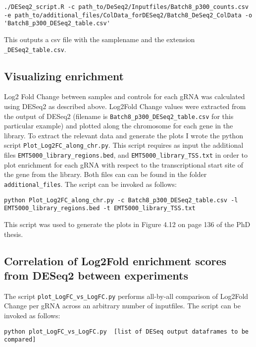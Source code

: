 \begin{small}\begin{lstlisting}
./DESeq2_script.R -c path_to/DeSeq2/Inputfiles/Batch8_p300_counts.csv -e path_to/additional_files/ColData_forDESeq2/Batch8_DeSeq2_ColData -o 'Batch8_p300_DESeq2_table.csv'
\end{lstlisting}\end{small}

This outputs a csv file with the samplename and the extension \verb|_DESeq2_table.csv|.

\subsection{Visualizing enrichment}
Log2 Fold Change between samples and controls for each gRNA was calculated using DESeq2 as described above. Log2Fold Change values were extracted from the output of DESeq2 (filename is \verb|Batch8_p300_DESeq2_table.csv| for this particular example) and plotted along the chromosome for each gene in the library. To extract the relevant data and generate the plots I wrote the python script \verb|Plot_Log2FC_along_chr.py|. This script requires as input the additional files \verb|EMT5000_library_regions.bed|, and \verb|EMT5000_library_TSS.txt| in order to plot enrichment for each gRNA with respect to the transcriptional start site of the gene from the library. Both files can can be found in the folder \verb|additional_files|. The script can be invoked as follows:

\begin{small}\begin{lstlisting}
python Plot_Log2FC_along_chr.py -c Batch8_p300_DESeq2_table.csv -l EMT5000_library_regions.bed -t EMT5000_library_TSS.txt
\end{lstlisting}\end{small}

This script was used to generate the plots in Figure 4.12 on page 136 of the PhD thesis.

\subsection{Correlation of Log2Fold enrichment scores from DESeq2 between experiments}

The script \verb|plot_LogFC_vs_LogFC.py| performs all-by-all comparison of Log2Fold Change per gRNA across an arbitrary number of inputfiles. The script can be invoked as follows:

\begin{small}\begin{lstlisting}
python plot_LogFC_vs_LogFC.py  [list of DESeq output dataframes to be compared]
\end{lstlisting}\end{small}

